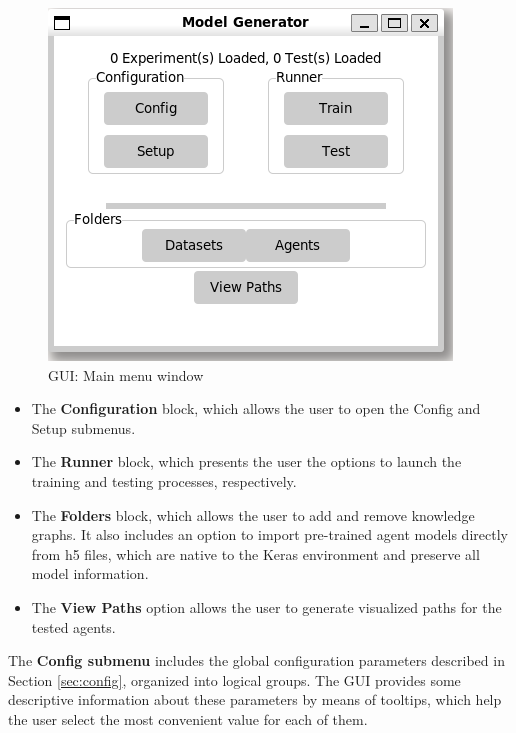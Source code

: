 \begin{figure}[!h]
    \centering
    \includegraphics[width=.45\textwidth]{fig/framework/GUI/mm_default}
    \caption{\toolname{} GUI: Main menu window}
    \label{fig:mm_default}
\end{figure}

\begin{itemize}
    \item The \textbf{Configuration} block, which allows the user to open the Config and Setup submenus.
    
    \item The \textbf{Runner} block, which presents the user the options to launch the training and testing processes, respectively.
    
    \item The \textbf{Folders} block, which allows the user to add and remove knowledge graphs. It also includes an option to import pre-trained agent models directly from h5 files, which are native to the Keras environment and preserve all model information.
    
    \item The \textbf{View Paths} option allows the user to generate visualized paths for the tested agents.
\end{itemize}

The \textbf{Config submenu} includes the global configuration parameters described in Section \ref{sec:config}, organized into logical groups. The GUI provides some  descriptive information about these parameters by means of tooltips, which help the user select the most convenient value for each of them. 


